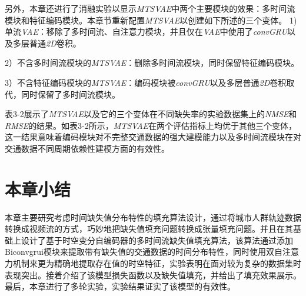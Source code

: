 \begin{table}[htbp]
\end{table}
另外，本章还进行了消融实验以显示\textit{MTSVAE}中两个主要模块的效果：多时间流模块和特征编码模块。本章节重新配置\textit{MTSVAE}以创建如下所述的三个变体。 
1)单流\textit{VAE}：移除了多时间流、自注意力模块，并且仅在\textit{VAE}中使用了\textit{convGRU}以及多层普通\textit{2D}卷积。 

2）不含多时间流模块的\textit{MTSVAE}：删除多时间流模块，同时保留特征编码模块。 

3）不含特征编码模块的\textit{MTSVAE}：编码模块被\textit{convGRU}以及多层普通\textit{2D}卷积取代，同时保留了多时间流模块。 

表3-2展示了\textit{MTSVAE}以及它的三个变体在不同缺失率的实验数据集上的\textit{NMSE}和\textit{RMSE}的结果。如表3-2所示，\textit{MTSVAE}在两个评估指标上均优于其他三个变体，这一结果意味着编码模块对不完整交通数据的强大建模能力以及多时间流模块在对交通数据不同周期依赖性建模方面的有效性。

\section{本章小结} \label{sec3_6}
本章主要研究考虑时间缺失值分布特性的填充算法设计，通过将城市人群轨迹数据转换成视频流的方式，巧妙地把缺失值填充问题转换成张量填充问题。并且在其基础上设计了基于时空变分自编码器的多时间流缺失值填充算法，该算法通过添加Biconvgrui模块来提取带有缺失值的交通数据的时间分布特性，同时使用双自注意力机制来更为精确地提取存在值的时空特征，实验表明在面对较为复杂的数据集时表现突出。接着介绍了该模型损失函数以及缺失值填充，并给出了填充效果展示。最后，本章进行了多轮实验，实验结果证实了该模型的有效性。

